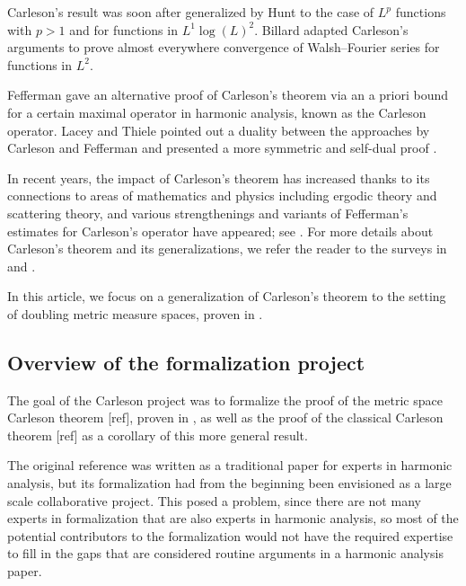 \documentclass[12pt]{amsart}
\theoremstyle{definition}
\theoremstyle{plain}
\begin{document}
Carleson's result was soon after generalized by Hunt \cite{MR238019} to the case of $L^p$ functions with $p>1$ and for functions in $L^1\log(L)^2$. Billard \cite{MR217510} adapted Carleson's arguments to prove almost everywhere convergence of Walsh--Fourier series
for functions in $L^2$.

Fefferman gave an alternative proof of Carleson's theorem \cite{fefferman} via an a priori bound for a certain maximal operator in harmonic analysis, known as the Carleson operator.
Lacey and Thiele pointed out a duality between the approaches by Carleson and Fefferman and presented a more symmetric and self-dual proof \cite{lacey-thiele}.

In recent years, the impact of Carleson's theorem has increased thanks to its connections to areas of mathematics and physics including ergodic theory and scattering theory, and various strengthenings and variants of Fefferman's estimates for Carleson's operator have appeared; see \cite[\S 1]{CarlesonBlueprint}. For more details about Carleson's theorem and its generalizations, we refer the reader to the surveys in \cite{MR2091007} and \cite{MR3334208}.


In this article, we focus on a generalization of Carleson's theorem to the setting of doubling metric measure spaces, proven in \cite{becker2024carlesonoperatorsdoublingmetric}.


\subsection{Overview of the formalization project}\label{subsec:overview}
The goal of the Carleson project was to formalize the proof of the metric space Carleson theorem [ref], proven in \cite{ThieleCarlesonPreprint}, as well as the proof of the classical Carleson theorem [ref] as a corollary of this more general result.

The original reference \cite{ThieleCarlesonPreprint} was written as a traditional paper for experts in harmonic analysis, but its formalization had from the beginning been envisioned as a large scale collaborative project. This posed a problem, since there are not many experts in formalization that are also experts in harmonic analysis, so most of the potential contributors to the formalization would not have the required expertise to fill in the gaps that are considered routine arguments in a harmonic analysis paper.
\end{document}
